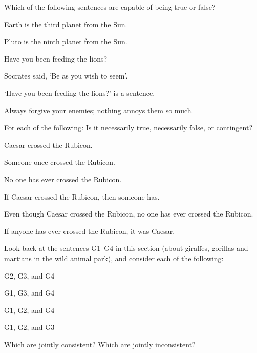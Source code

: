 

\practiceproblems
\problempart Which of the following sentences are capable of being true or false?
\begin{earg}
	\item Earth is the third planet from the Sun.
	\item Pluto is the ninth planet from the Sun.
	\item Have you been feeding the lions?
	\item Socrates said, `Be as you wish to seem'.
	\item `Have you been feeding the lions?' is a sentence.
	\item Always forgive your enemies; nothing annoys them so much.
\end{earg}

\problempart
\label{pr.EnglishTautology}
For each of the following: Is it necessarily true, necessarily false, or contingent?
\begin{earg}
\item Caesar crossed the Rubicon.
\item Someone once crossed the Rubicon.
\item No one has ever crossed the Rubicon.
\item If Caesar crossed the Rubicon, then someone has.
\item Even though Caesar crossed the Rubicon, no one has ever crossed the Rubicon.
\item If anyone has ever crossed the Rubicon, it was Caesar.
\end{earg}

\problempart
\label{pr.MartianGiraffes}
Look back at the sentences G1–G4 in this section (about giraffes, gorillas and martians in the wild animal park), and consider each of the following:
\begin{earg}
\item G2, G3, and G4
\item G1, G3, and G4
\item G1, G2, and G4
\item G1, G2, and G3
\end{earg}
Which are jointly consistent? Which are jointly inconsistent? 



